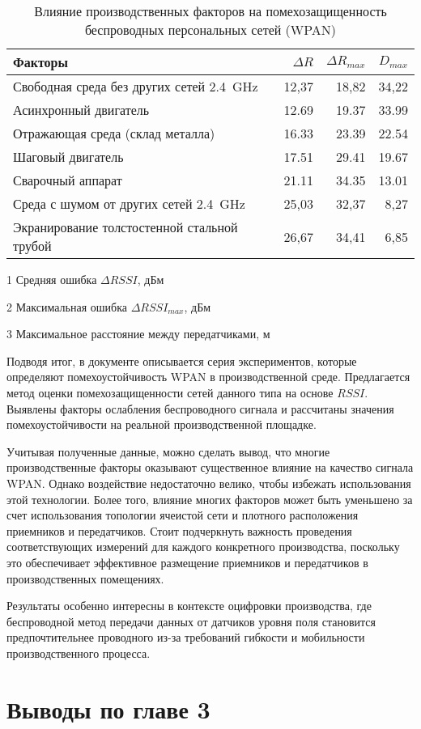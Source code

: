 \begin{table}[!htb]
\centering
\caption{Влияние производственных факторов на помехозащищенность беспроводных персональных сетей (WPAN)} \vspace{4pt}
\label{tab-2}
\begin{threeparttable}
\begin{tabularx}{\linewidth}{@{} lrrr}
	\toprule
	\textbf{Факторы} &
	{\small $\Delta R$} \tnote{1} &
	{\small $\Delta R_{max}$} \tnote{2} &
	{\small $D_{max}$} \tnote{3} \\
	\midrule
	Свободная среда без других сетей \SI{2,4}{\giga\hertz} & 12,37 & 18,82 & 34,22 \\
	Асинхронный двигатель & 12.69 & 19.37 & 33.99 \\
	Отражающая среда (склад металла) & 16.33 & 23.39 & 22.54 \\
	Шаговый двигатель & 17.51 & 29.41 & 19.67 \\
	Сварочный аппарат & 21.11 & 34.35 & 13.01 \\
	Среда с шумом от других сетей \SI{2,4}{\giga\hertz} & 25,03 & 32,37 & 8,27 \\
	Экранирование толстостенной стальной трубой & 26,67 & 34,41 & 6,85 \\
	\bottomrule
\end{tabularx}
\begin{tablenotes} \footnotesize
	\item [1] Средняя ошибка $\Delta RSSI$, дБм
	\item [2] Максимальная ошибка $\Delta RSSI_{max}$, дБм
	\item [3] Максимальное расстояние между передатчиками, м
\end{tablenotes}
\end{threeparttable}
\end{table}

Подводя итог, в документе описывается серия экспериментов, которые определяют помехоустойчивость WPAN в производственной среде. Предлагается метод оценки помехозащищенности сетей данного типа на основе $RSSI$. Выявлены факторы ослабления беспроводного сигнала и рассчитаны значения помехоустойчивости на реальной производственной площадке.

Учитывая полученные данные, можно сделать вывод, что многие производственные факторы оказывают существенное влияние на качество сигнала WPAN. Однако воздействие недостаточно велико, чтобы избежать использования этой технологии. Более того, влияние многих факторов может быть уменьшено за счет использования топологии ячеистой сети и плотного расположения приемников и передатчиков. Стоит подчеркнуть важность проведения соответствующих измерений для каждого конкретного производства, поскольку это обеспечивает эффективное размещение приемников и передатчиков в производственных помещениях.

Результаты особенно интересны в контексте оцифровки производства, где беспроводной метод передачи данных от датчиков уровня поля становится предпочтительнее проводного из-за требований гибкости и мобильности производственного процесса.

\section{Выводы по главе 3}

\FloatBarrier